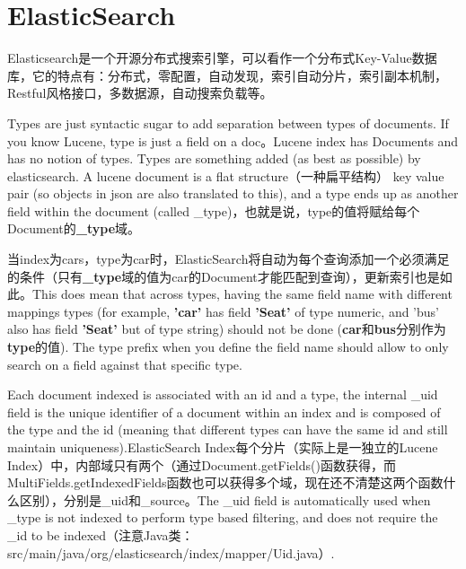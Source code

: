 \section{ElasticSearch}
\par Elasticsearch是一个开源分布式搜索引擎，可以看作一个分布式Key-Value数据库，它的特点有：分布式，零配置，自动发现，索引自动分片，索引副本机制，Restful风格接口，多数据源，自动搜索负载等。
\par Types are just syntactic sugar to add separation between types of documents. If you know Lucene, type is just a field on a doc。Lucene index has Documents and has no notion of types. Types are something added (as best as possible) by elasticsearch. A lucene document is a flat structure（一种扁平结构） key value pair (so objects in json are also translated to this), and a type ends up as another field within the document (called \_type)，也就是说，type的值将赋给每个Document的\textbf{\_type}域。
\par 当index为cars，type为car时，ElasticSearch将自动为每个查询添加一个必须满足的条件（只有\textbf{\_type}域的值为car的Document才能匹配到查询），更新索引也是如此。This does mean that across types, having the same field name with different mappings types (for example, \textbf{'car'} has field \textbf{'Seat'} of type numeric, and 'bus' also has field \textbf{'Seat'} but of type string) should not be done (\textbf{car}和\textbf{bus}分别作为\textbf{type}的值). The type prefix when you define the field name should allow to only search on a field against that specific type.
\par Each document indexed is associated with an id and a type, the internal \_uid field is the unique identifier of a document within an index and is composed of the type and the id (meaning that different types can have the same id and still maintain uniqueness).ElasticSearch Index每个分片（实际上是一独立的Lucene Index）中，内部域只有两个（通过Document.getFields()函数获得，而MultiFields.getIndexedFields函数也可以获得多个域，现在还不清楚这两个函数什么区别），分别是\_uid和\_source。The \_uid field is automatically used when \_type is not indexed to perform type based filtering, and does not require the \_id to be indexed（注意Java类：src/main/java/org/elasticsearch/index/mapper/Uid.java）.
